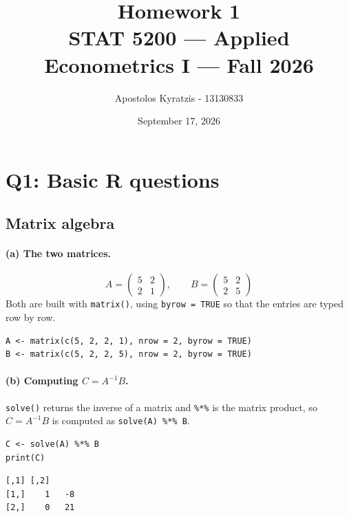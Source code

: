\documentclass[11pt]{article}
\title{\vspace{-2em}Homework 1\\[0.3em]
       \large STAT 5200 --- Applied Econometrics I --- Fall 2026}
\author{Apostolos Kyratzis - 13130833}
\date{September 17, 2026}
\newcommand{\code}[1]{\texttt{#1}}
\begin{document}
\maketitle

\section{Q1: Basic R questions}

\subsection{Matrix algebra}
\label{sec:q1-matrix}

\paragraph{(a) The two matrices.}
\[
A=\begin{pmatrix} 5 & 2\\ 2 & 1 \end{pmatrix},
\qquad
B=\begin{pmatrix} 5 & 2\\ 2 & 5 \end{pmatrix}
\]
Both are built with \code{matrix()}, using \code{byrow = TRUE} so that the
entries are typed row by row.

\begin{lstlisting}[style=Rcode]
A <- matrix(c(5, 2, 2, 1), nrow = 2, byrow = TRUE)
B <- matrix(c(5, 2, 2, 5), nrow = 2, byrow = TRUE)
\end{lstlisting}

\paragraph{(b) Computing $C = A^{-1}B$.}
\code{solve()} returns the inverse of a matrix and \code{\%*\%} is the matrix
product, so $C = A^{-1}B$ is computed as \code{solve(A) \%*\% B}.

\begin{lstlisting}[style=Rcode]
C <- solve(A) %*% B
print(C)
\end{lstlisting}

\begin{lstlisting}[style=Routput]
     [,1] [,2]
[1,]    1   -8
[2,]    0   21
\end{lstlisting}
\end{document}
